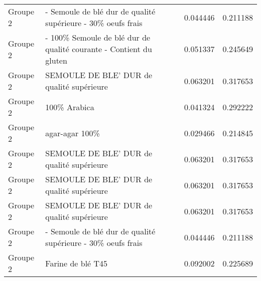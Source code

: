 \begin{tabular}{lp{9cm}cc}
Groupe 2 &        - Semoule de blé dur de qualité supérieure \newline - 30\% oeufs frais &  0.044446 &  0.211188 \\
Groupe 2 &  - 100\% Semoule de blé dur de qualité courante \newline - Contient du gluten &  0.051337 &  0.245649 \\
Groupe 2 &                            SEMOULE DE BLE' DUR de qualité supérieure &  0.063201 &  0.317653 \\
Groupe 2 &                                                         100\% Arabica &  0.041324 &  0.292222 \\
Groupe 2 &                                                       agar-agar 100\% &  0.029466 &  0.214845 \\
Groupe 2 &                            SEMOULE DE BLE' DUR de qualité supérieure &  0.063201 &  0.317653 \\
Groupe 2 &                            SEMOULE DE BLE' DUR de qualité supérieure &  0.063201 &  0.317653 \\
Groupe 2 &                            SEMOULE DE BLE' DUR de qualité supérieure &  0.063201 &  0.317653 \\
Groupe 2 &        - Semoule de blé dur de qualité supérieure \newline - 30\% oeufs frais &  0.044446 &  0.211188 \\
Groupe 2 &                                                    Farine de blé T45 &  0.092002 &  0.225689 \\
\bottomrule
\end{tabular}
